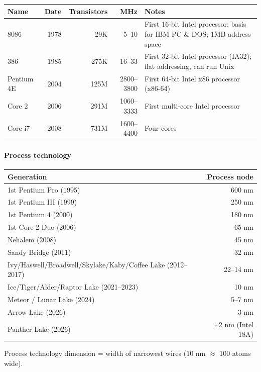 \begin{center}
\begin{tabular}{@{}lrrrp{6cm}@{}}
\toprule
Name & Date & Transistors & MHz & Notes \\
\midrule
8086     & 1978 & 29K   & 5--10     & First 16-bit Intel processor; basis for IBM PC \& DOS; 1MB address space \\
386      & 1985 & 275K  & 16--33    & First 32-bit Intel processor (IA32); flat addressing, can run Unix \\
Pentium 4E & 2004 & 125M & 2800--3800 & First 64-bit Intel x86 processor (x86-64) \\
Core 2   & 2006 & 291M  & 1060--3333 & First multi-core Intel processor \\
Core i7  & 2008 & 731M  & 1600--4400 & Four cores \\
\bottomrule
\end{tabular}
\end{center}

\paragraph{Process technology}

\begin{center}
\begin{tabular}{@{}lr@{}}
\toprule
Generation & Process node \\
\midrule
1st Pentium Pro (1995) & 600 nm \\
1st Pentium III (1999) & 250 nm \\
1st Pentium 4 (2000)   & 180 nm \\
1st Core 2 Duo (2006)  & 65 nm \\
Nehalem (2008)         & 45 nm \\
Sandy Bridge (2011)    & 32 nm \\
Ivy/Haswell/Broadwell/Skylake/Kaby/Coffee Lake (2012--2017) & 22--14 nm \\
Ice/Tiger/Alder/Raptor Lake (2021--2023) & 10 nm \\
Meteor / Lunar Lake (2024) & 5--7 nm \\
Arrow Lake (2026)      & 3 nm \\
Panther Lake (2026)    & $\sim$2 nm (Intel 18A) \\
\bottomrule
\end{tabular}
\end{center}
Process technology dimension = width of narrowest wires (10 nm $\approx$ 100
atoms wide).

